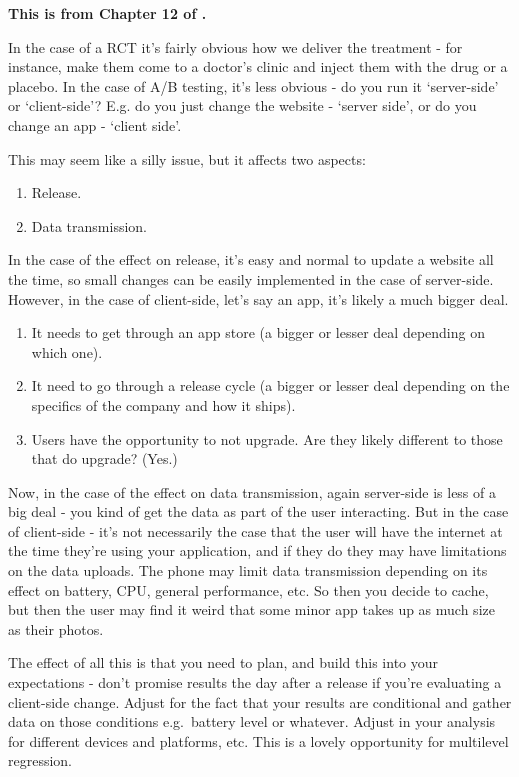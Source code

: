 \documentclass[
]{book}
\providecommand{\tightlist}{%
  \setlength{\itemsep}{0pt}\setlength{\parskip}{0pt}}
\begin{document}
\textbf{This is from Chapter 12 of \citet{kohavi}.}

In the case of a RCT it's fairly obvious how we deliver the treatment - for instance, make them come to a doctor's clinic and inject them with the drug or a placebo. In the case of A/B testing, it's less obvious - do you run it `server-side' or `client-side'? E.g. do you just change the website - `server side', or do you change an app - `client side'.

This may seem like a silly issue, but it affects two aspects:

\begin{enumerate}
\def\labelenumi{\arabic{enumi}.}
\tightlist
\item
  Release.
\item
  Data transmission.
\end{enumerate}

In the case of the effect on release, it's easy and normal to update a website all the time, so small changes can be easily implemented in the case of server-side. However, in the case of client-side, let's say an app, it's likely a much bigger deal.

\begin{enumerate}
\def\labelenumi{\arabic{enumi}.}
\tightlist
\item
  It needs to get through an app store (a bigger or lesser deal depending on which one).
\item
  It need to go through a release cycle (a bigger or lesser deal depending on the specifics of the company and how it ships).
\item
  Users have the opportunity to not upgrade. Are they likely different to those that do upgrade? (Yes.)
\end{enumerate}

Now, in the case of the effect on data transmission, again server-side is less of a big deal - you kind of get the data as part of the user interacting. But in the case of client-side - it's not necessarily the case that the user will have the internet at the time they're using your application, and if they do they may have limitations on the data uploads. The phone may limit data transmission depending on its effect on battery, CPU, general performance, etc. So then you decide to cache, but then the user may find it weird that some minor app takes up as much size as their photos.

The effect of all this is that you need to plan, and build this into your expectations - don't promise results the day after a release if you're evaluating a client-side change. Adjust for the fact that your results are conditional and gather data on those conditions e.g.~battery level or whatever. Adjust in your analysis for different devices and platforms, etc. This is a lovely opportunity for multilevel regression.
\end{document}

